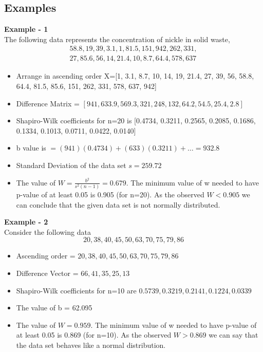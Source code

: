 \documentclass{article}
\begin{document}
\subsection{Examples}
\textbf{Example - 1}\\
The following data represents the concentration of nickle in solid waste,\begin{align*} 58.8,19,39,3.1,1,81.5,151,942,262,
    331,\\27,85.6,56,14,21.4,10,8.7,64.4,578,637 \end{align*}
    \begin{itemize}
 
        \item Arrange in ascending order X=[1, 3.1, 8.7, 10, 14, 19, 21.4, 27, 39, 56, 58.8, 64.4, 81.5, 85.6, 151, 262, 331, 578, 637, 942]
        \item Difference Matrix = $[ 941,633.9,569.3,321,248,132,64.2,54.5,25.4,2.8]$
        \item Shapiro-Wilk coefficients for n=20 is  
        [0.4734, 0.3211, 0.2565, 0.2085, 0.1686, 0.1334, 0.1013, 0.0711, 0.0422, 0.0140]
        \item b value is $=(941)(0.4734)+(633)(0.3211)+\dots = 932.8$
        \item Standard Deviation of the data set $s=259.72$
        \item The value of $W=\frac{b^{2}}{s^{2}(n-1)}=0.679$. The minimum value of w needed to have p-value of at least 0.05 is 0.905 (for n=20). As the observed $W<0.905$ we can conclude that the given data set is not normally distributed.
    \end{itemize}

\noindent \textbf{Example - 2}\\
Consider the following data
$$20,38,40,45,50,63,70,75,79,86$$
\begin{itemize}
    \item Ascending order = $20,38,40,45,50,63,70,75,79,86$
    \item Difference Vector = $66,41,35,25,13$
    \item Shapiro-Wilk coefficients for n=10 are $0.5739,0.3219,0.2141,0.1224,0.0339$
    \item The value of b = 62.095
    \item The value of $W=0.959$. The minimum value of w needed to have p-value of at least 0.05 is 0.869 (for n=10). As the observed $W>0.869$ we can say that the data set behaves like a normal distribution. 
\end{itemize}
\end{document}
